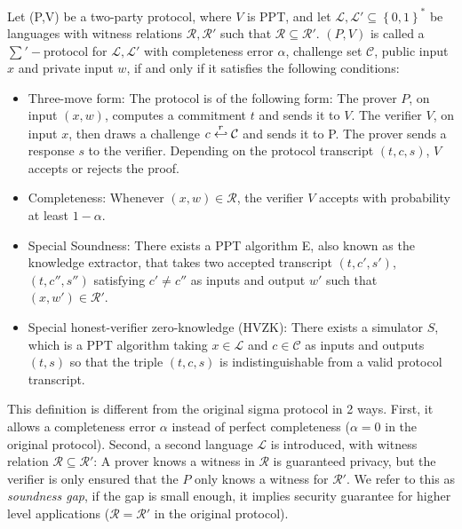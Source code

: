 \begin{definition}
  \label{def:zkp-sum-protocol}
  Let (P,V) be a two-party protocol, where $V$ is PPT, and let
  $\mathcal{L},\mathcal{L'} \subseteq \left\{ 0,1 \right\}^*$ be languages with
  witness relations $\mathcal{R},\mathcal{R'}$ such that $\mathcal{R}
  \subseteq \mathcal{R'}$. $(P,V)$ is called a $\sum'-$protocol for
  $\mathcal{L}, \mathcal{L'}$ with completeness error $\alpha$, challenge set
  $\mathcal{C}$, public input $x$ and private input $w$, if and only if it
  satisfies the following conditions:
  \begin{itemize}
  \item Three-move form: The protocol is of the following form: The
    prover $P$, on input $(x,w)$, computes a commitment $t$ and sends it
    to $V$. The verifier $V$, on input $x$, then draws a challenge
    $c \stackrel{r}{\hookleftarrow} \mathcal{C}$ and sends it to P. The prover sends a
    response $s$ to the verifier. Depending on the protocol transcript
    $(t,c,s)$, $V$ accepts or rejects the proof.
  \item Completeness: Whenever $(x,w) \in \mathcal{R}$, the verifier
    $V$ accepts with probability at least $1 - \alpha$.
  \item Special Soundness: There exists a PPT algorithm E, also known as
    the knowledge extractor, that takes two accepted transcript
    $(t,c',s')$,$(t,c'',s'')$ satisfying $c' \neq c''$ as inputs and
    output $w'$ such that $(x,w') \in \mathcal{R'}$.
  \item Special honest-verifier zero-knowledge (HVZK): There exists a
    simulator $S$, which is a PPT
    algorithm taking $x\in \mathcal{L}$ and $c \in \mathcal{C}$ as
    inputs and outputs $(t,s)$ so that the triple $(t,c,s)$ is
    indistinguishable from a valid protocol transcript.
  \end{itemize}
\end{definition}

This definition is different from the original sigma protocol in 2 ways.
First, it allows a completeness error $\alpha$ instead of perfect completeness
($\alpha=0$ in the original protocol).
Second, a second language $\mathcal{L}$ is introduced, with witness relation
$\mathcal{R} \subseteq \mathcal{R'}$: A prover knows a witness in $\mathcal{R}$
is guaranteed privacy, but the verifier is only ensured that the $P$ only knows
a witness for $\mathcal{R'}$. We refer to this as \emph{soundness gap}, if the
gap is small enough, it implies security guarantee for higher level applications
($\mathcal{R} = \mathcal{R'}$ in the original protocol).

